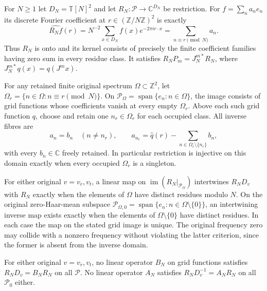 \begin{theorem}
\label{thm:ns-reverse-sampling-fibres}
For $N\ge1$ let $D_N=\mathbb T[N]^2$ and let
$R_N:\mathcal P\to\mathbb C^{D_N}$ be restriction.
For $f=\sum_na_ne_n$ its discrete Fourier coefficient
at $r\in(\mathbb Z/N\mathbb Z)^2$ is exactly
\[
 \widehat {R_Nf}(r)=
 N^{-2}\sum_{x\in D_N}f(x)e^{-2\pi i r\cdot x}
 =\sum_{n\equiv r\pmod N}a_n.
\]
Thus $R_N$ is onto and its kernel consists of precisely
the finite coefficient families having zero sum in every
residue class. It satisfies $R_NP_m=J_N^{m*}R_N$,
where $J_N^{m*}q(x)=q(J^mx)$.

For any retained finite original spectrum $\Omega\subset\mathbb Z^2$,
let $\Omega_r=\{n\in\Omega:n\equiv r\pmod N\}$.
On $\mathcal P_\Omega=\operatorname{span}\{e_n:n\in\Omega\}$,
the image consists of grid functions whose coefficients
vanish at every empty $\Omega_r$. Above each such grid
function $q$, choose and retain one $n_r\in\Omega_r$
for each occupied class. All inverse fibres are
\[
 a_n=b_n\quad(n\ne n_r),\qquad
 a_{n_r}=\widehat q(r)-\sum_{n\in\Omega_r\setminus\{n_r\}}b_n,
\]
with every $b_n\in\mathbb C$ freely retained.
In particular restriction is injective on this domain
exactly when every occupied $\Omega_r$ is a singleton.

For either original $v=v_r,v_t$, a linear map on
$\operatorname{im}(R_N|_{\mathcal P_\Omega})$ intertwines
$R_ND_v$ with $R_N$ exactly when the elements of $\Omega$
have distinct residues modulo $N$. On the original zero-Haar-mean
subspace $\mathcal P_{\Omega,0}
=\operatorname{span}\{e_n:n\in\Omega\setminus\{0\}\}$,
an intertwining inverse map exists exactly when the elements
of $\Omega\setminus\{0\}$ have distinct residues. In each
case the map on the stated grid image is unique. The original
frequency zero may collide with a nonzero frequency without
violating the latter criterion, since the former is absent
from the inverse domain.

For either original $v=v_r,v_t$, no linear operator
$B_N$ on grid functions satisfies $R_ND_v=B_NR_N$
on all $\mathcal P$. No linear operator $A_N$ satisfies
$R_ND_v^{-1}=A_NR_N$ on all $\mathcal P_0$ either.
\end{theorem}
